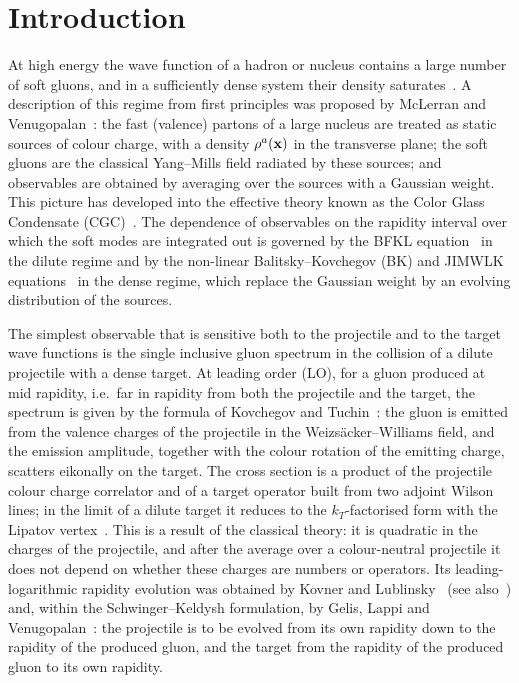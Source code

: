 \section{Introduction}\label{sec:intro}

At high energy the wave function of a hadron or nucleus contains a large number of soft gluons, and in a sufficiently dense system their density saturates~\cite{Gribov:1983ivg,Mueller:1985wy}. A description of this regime from first principles was proposed by McLerran and Venugopalan~\cite{McLerran:1993ni,McLerran:1993ka}: the fast (valence) partons of a large nucleus are treated as static sources of colour charge, with a density $\rho^a(\mathbf{x})$ in the transverse plane; the soft gluons are the classical Yang--Mills field radiated by these sources; and observables are obtained by averaging over the sources with a Gaussian weight. This picture has developed into the effective theory known as the Color Glass Condensate (CGC)~\cite{Iancu:2003xm,Weigert:2005us,Gelis:2010nm,Kovchegov:2012mbw}. The dependence of observables on the rapidity interval over which the soft modes are integrated out is governed by the BFKL equation~\cite{Kuraev:1977fs,Balitsky:1978ic} in the dilute regime and by the non-linear Balitsky--Kovchegov (BK) and JIMWLK equations~\cite{Balitsky:1995ub,Kovchegov:1999yj,Kovchegov:1999ua,Jalilian-Marian:1997qno,Jalilian-Marian:1997jx,Jalilian-Marian:1997ubg,Kovner:2000pt,Weigert:2000gi,Iancu:2000hn,Iancu:2001ad,Ferreiro:2001qy} in the dense regime, which replace the Gaussian weight by an evolving distribution of the sources.

The simplest observable that is sensitive both to the projectile and to the target wave functions is the single inclusive gluon spectrum in the collision of a dilute projectile with a dense target. At leading order (LO), for a gluon produced at mid rapidity, i.e.\ far in rapidity from both the projectile and the target, the spectrum is given by the formula of Kovchegov and Tuchin~\cite{Kovchegov:2001sc,Kovchegov:1998bi}: the gluon is emitted from the valence charges of the projectile in the Weizs\"acker--Williams field, and the emission amplitude, together with the colour rotation of the emitting charge, scatters eikonally on the target. The cross section is a product of the projectile colour charge correlator and of a target operator built from two adjoint Wilson lines; in the limit of a dilute target it reduces to the $k_T$-factorised form with the Lipatov vertex~\cite{Gribov:1983ivg,Kharzeev:2003wz,Blaizot:2004wu}. This is a result of the classical theory: it is quadratic in the charges of the projectile, and after the average over a colour-neutral projectile it does not depend on whether these charges are numbers or operators. Its leading-logarithmic rapidity evolution was obtained by Kovner and Lublinsky~\cite{Kovner:2006wr} (see also~\cite{Kovner:2006ge}) and, within the Schwinger--Keldysh formulation, by Gelis, Lappi and Venugopalan~\cite{Gelis:2008rw}: the projectile is to be evolved from its own rapidity down to the rapidity of the produced gluon, and the target from the rapidity of the produced gluon to its own rapidity.

